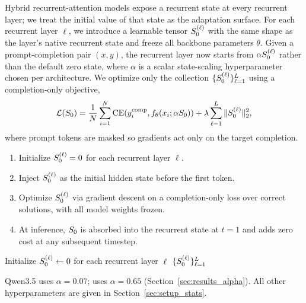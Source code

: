 \documentclass{article}
\begin{document}
Hybrid recurrent-attention models expose a recurrent state at every recurrent
layer; we treat the initial value of that state as the adaptation surface. For
each recurrent layer $\ell$, we introduce a learnable tensor
$S_0^{(\ell)}$ with the same shape as the layer's native recurrent state and
freeze all backbone parameters $\theta$. Given a prompt-completion pair
$(x, y)$, the recurrent layer now starts from $\alpha S_0^{(\ell)}$ rather
than the default zero state, where $\alpha$ is a scalar state-scaling
hyperparameter chosen per architecture. We optimize only the collection
$\{S_0^{(\ell)}\}_{\ell=1}^L$ using a completion-only objective,
\[
\mathcal{L}(S_0) =
\frac{1}{N}\sum_{i=1}^N
\mathrm{CE}\!\left(y_i^{\mathrm{comp}},
f_\theta(x_i; \alpha S_0)\right) +
\lambda \sum_{\ell=1}^L \|S_0^{(\ell)}\|_2^2,
\]
where prompt tokens are masked so gradients act only on the target completion.
\begin{enumerate}
  \item Initialize $S_0^{(\ell)} = 0$ for each recurrent layer $\ell$.
  \item Inject $S_0^{(\ell)}$ as the initial hidden state before the first token.
  \item Optimize $S_0^{(\ell)}$ via gradient descent on a completion-only loss over correct solutions, with all model weights frozen.
  \item At inference, $S_0$ is absorbed into the recurrent state at $t=1$ and adds zero cost at any subsequent timestep.
\end{enumerate}

\begin{algorithm}[t]
\caption{\method}
\label{alg:s0_tuning}
Initialize $S_0^{(\ell)} \gets 0$ for each recurrent layer $\ell$\;
\Return $\{S_0^{(\ell)}\}_{\ell=1}^L$\;
\end{algorithm}

Qwen3.5 uses $\alpha = 0.07$; \falcon uses $\alpha = 0.65$ (Section~\ref{sec:results_alpha}).
All other hyperparameters are given in Section~\ref{sec:setup_stats}.
\end{document}
